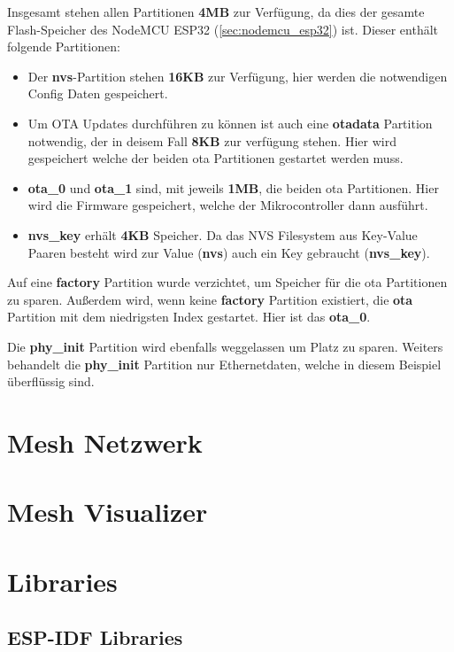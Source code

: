 Insgesamt stehen allen Partitionen \textbf{4MB} zur Verfügung, da dies der gesamte Flash-Speicher des NodeMCU ESP32 (\ref{sec:nodemcu_esp32}) ist. Dieser enthält folgende Partitionen:
\begin{itemize}
    \item Der \textbf{nvs}-Partition stehen \textbf{16KB} zur Verfügung, hier werden die notwendigen Config Daten gespeichert.
    \item Um OTA Updates durchführen zu können ist auch eine \textbf{otadata} Partition notwendig, der in deisem Fall \textbf{8KB} zur verfügung stehen. Hier wird gespeichert welche der beiden ota Partitionen gestartet werden muss.
    \item \textbf{ota\_0} und \textbf{ota\_1} sind, mit jeweils \textbf{1MB}, die beiden ota Partitionen. Hier wird die Firmware gespeichert, welche der Mikrocontroller dann ausführt.
    \item \textbf{nvs\_key} erhält \textbf{4KB} Speicher. Da das NVS Filesystem aus Key-Value Paaren besteht wird zur Value (\textbf{nvs}) auch ein Key gebraucht (\textbf{nvs\_key}).
\end{itemize}

Auf eine \textbf{factory} Partition wurde verzichtet, um Speicher für die ota Partitionen zu sparen. Außerdem wird, wenn keine \textbf{factory} Partition existiert, die \textbf{ota} Partition mit dem niedrigsten Index gestartet. Hier ist das \textbf{ota\_0}.

Die \textbf{phy\_init} Partition wird ebenfalls weggelassen um Platz zu sparen. Weiters behandelt die \textbf{phy\_init} Partition nur Ethernetdaten, welche in diesem Beispiel überflüssig sind.

\section{Mesh Netzwerk}\label{sec:mesh}

\section{Mesh Visualizer}\label{sec:mesh-visualizer}


\section{Libraries}\label{sec:libraries}

\subsection{ESP-IDF Libraries}\label{sec:esp-idf-libraries}

